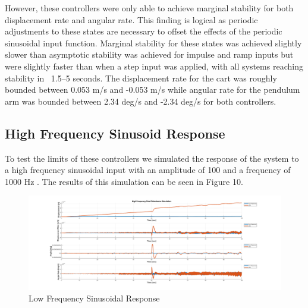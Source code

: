 \documentclass[titlepage]{article}
\begin{document}
However, these controllers were only able to achieve marginal stability for both displacement rate and angular rate. This finding is logical as periodic adjustments to these states are necessary to offset the effects of the periodic sinusoidal input function.  Marginal stability for these states was achieved slightly slower than asymptotic stability was achieved for impulse and ramp inputs but were slightly faster than when a step input was applied, with all systems reaching stability in ~1.5–5 seconds. The displacement rate for the cart was roughly bounded between 0.053 m/s and -0.053 m/s while angular rate for the pendulum arm was bounded between 2.34 deg/s and -2.34 deg/s for both controllers.\\

\subsection{High Frequency Sinusoid Response}

To test the limits of these controllers we simulated the response of the system to a high frequency sinusoidal input with an amplitude of 100  and a frequency of 1000 Hz . The results of this simulation can be seen in Figure 10.

\begin{figure}[h]
    \includegraphics[width=1\linewidth]{high_freq_sine.png}
    \caption{Low Frequency Sinusoidal Response}
    \label{fig:enter-label}
\end{figure}
\end{document}
